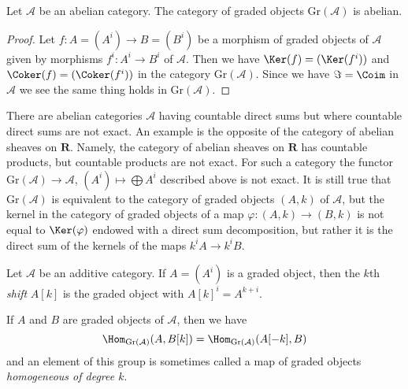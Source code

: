 \begin{lemma}
\label{lemma-graded}
Let $\mathcal{A}$ be an abelian category. The category of graded objects
$\text{Gr}(\mathcal{A})$ is abelian.
\end{lemma}

\begin{proof}
Let $f : A = (A^i) \to B = (B^i)$ be a morphism of graded objects
of $\mathcal{A}$ given by
morphisms $f^i : A^i \to B^i$ of $\mathcal{A}$.
Then we have $\Ker(f) = (\Ker(f^i))$ and $\Coker(f) = (\Coker(f^i))$
in the category $\text{Gr}(\mathcal{A})$.
Since we have $\Im = \Coim$ in $\mathcal{A}$
we see the same thing holds in $\text{Gr}(\mathcal{A})$.
\end{proof}

\begin{remark}[Warning]
\label{remark-direct-sums-not-exact}
There are abelian categories $\mathcal{A}$ having countable direct sums
but where countable direct sums are not exact. An example
is the opposite of the category of abelian sheaves on $\mathbf{R}$.
Namely, the category of abelian sheaves on $\mathbf{R}$ has
countable products, but countable products are not exact.
For such a category the functor $\text{Gr}(\mathcal{A}) \to \mathcal{A}$,
$(A^i) \mapsto \bigoplus A^i$
described above is not exact. It is still true that
$\text{Gr}(\mathcal{A})$ is equivalent to the category of
graded objects $(A, k)$ of $\mathcal{A}$, but the kernel in the category
of graded objects of a map $\varphi : (A, k) \to (B, k)$ is not equal to
$\Ker(\varphi)$ endowed with a direct sum decomposition, but rather it is
the direct sum of the kernels of the maps $k^iA \to k^iB$.
\end{remark}

\begin{definition}
\label{definition-graded-shift}
Let $\mathcal{A}$ be an additive category. If $A = (A^i)$ is a graded object,
then the $k$th {\it shift} $A[k]$ is the graded object with
$A[k]^i = A^{k + i}$.
\end{definition}

\noindent
If $A$ and $B$ are graded objects of $\mathcal{A}$, then we have
\begin{equation}
\label{equation-hom-into-shift}
\Hom_{\text{Gr}(\mathcal{A})}(A, B[k]) =
\Hom_{\text{Gr}(\mathcal{A})}(A[-k], B)
\end{equation}
and an element of this group is sometimes called a map of graded
objects {\it homogeneous of degree $k$}.

